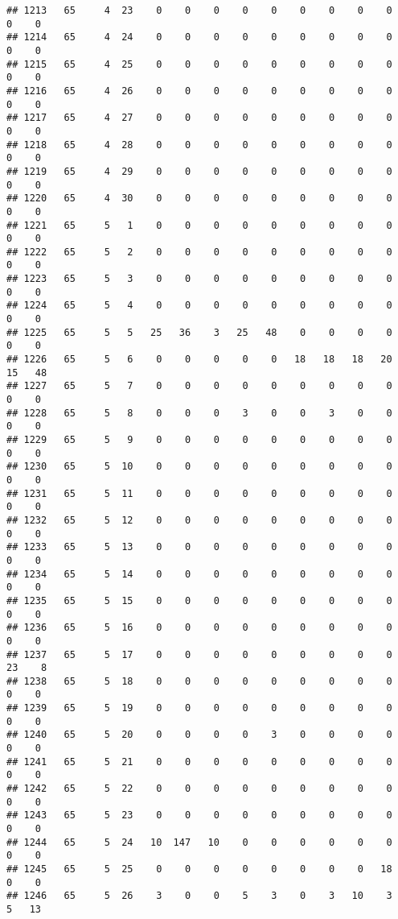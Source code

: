 \documentclass[]{article}
\begin{document}
\begin{verbatim}
## 1213   65     4  23    0    0    0    0    0    0    0    0    0    0    0
## 1214   65     4  24    0    0    0    0    0    0    0    0    0    0    0
## 1215   65     4  25    0    0    0    0    0    0    0    0    0    0    0
## 1216   65     4  26    0    0    0    0    0    0    0    0    0    0    0
## 1217   65     4  27    0    0    0    0    0    0    0    0    0    0    0
## 1218   65     4  28    0    0    0    0    0    0    0    0    0    0    0
## 1219   65     4  29    0    0    0    0    0    0    0    0    0    0    0
## 1220   65     4  30    0    0    0    0    0    0    0    0    0    0    0
## 1221   65     5   1    0    0    0    0    0    0    0    0    0    0    0
## 1222   65     5   2    0    0    0    0    0    0    0    0    0    0    0
## 1223   65     5   3    0    0    0    0    0    0    0    0    0    0    0
## 1224   65     5   4    0    0    0    0    0    0    0    0    0    0    0
## 1225   65     5   5   25   36    3   25   48    0    0    0    0    0    0
## 1226   65     5   6    0    0    0    0    0   18   18   18   20   15   48
## 1227   65     5   7    0    0    0    0    0    0    0    0    0    0    0
## 1228   65     5   8    0    0    0    3    0    0    3    0    0    0    0
## 1229   65     5   9    0    0    0    0    0    0    0    0    0    0    0
## 1230   65     5  10    0    0    0    0    0    0    0    0    0    0    0
## 1231   65     5  11    0    0    0    0    0    0    0    0    0    0    0
## 1232   65     5  12    0    0    0    0    0    0    0    0    0    0    0
## 1233   65     5  13    0    0    0    0    0    0    0    0    0    0    0
## 1234   65     5  14    0    0    0    0    0    0    0    0    0    0    0
## 1235   65     5  15    0    0    0    0    0    0    0    0    0    0    0
## 1236   65     5  16    0    0    0    0    0    0    0    0    0    0    0
## 1237   65     5  17    0    0    0    0    0    0    0    0    0   23    8
## 1238   65     5  18    0    0    0    0    0    0    0    0    0    0    0
## 1239   65     5  19    0    0    0    0    0    0    0    0    0    0    0
## 1240   65     5  20    0    0    0    0    3    0    0    0    0    0    0
## 1241   65     5  21    0    0    0    0    0    0    0    0    0    0    0
## 1242   65     5  22    0    0    0    0    0    0    0    0    0    0    0
## 1243   65     5  23    0    0    0    0    0    0    0    0    0    0    0
## 1244   65     5  24   10  147   10    0    0    0    0    0    0    0    0
## 1245   65     5  25    0    0    0    0    0    0    0    0   18    0    0
## 1246   65     5  26    3    0    0    5    3    0    3   10    3    5   13

\end{verbatim}
\end{document}
